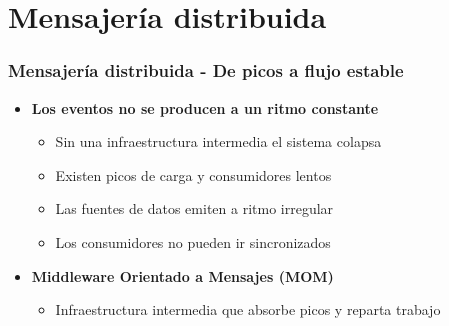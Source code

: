 \documentclass[aspectratio=169]{beamer}
\begin{document}
\section{Mensajería distribuida}

\begin{frame}
\frametitle{Mensajería distribuida - De picos a flujo estable}
\begin{itemize}
  \item \textbf{Los eventos no se producen a un ritmo constante}
  \begin{itemize}
    \item Sin una infraestructura intermedia el sistema colapsa
    \item Existen picos de carga y consumidores lentos
    \item Las fuentes de datos emiten a ritmo irregular
    \item Los consumidores no pueden ir sincronizados
  \end{itemize}

  \vspace{1em}

  \item \textbf{Middleware Orientado a Mensajes (MOM)}
  \begin{itemize}
    \item Infraestructura intermedia que absorbe picos y reparta trabajo
  \end{itemize}
\end{itemize}
\end{frame}
\end{document}
